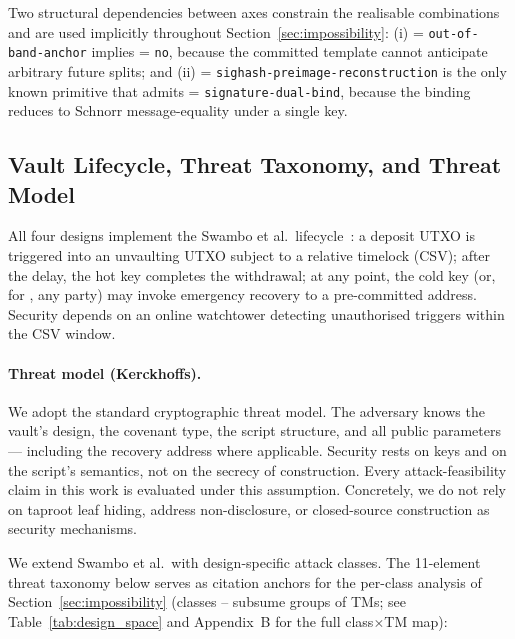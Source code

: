 Two structural dependencies between axes constrain the realisable
combinations and are used implicitly throughout
Section~\ref{sec:impossibility}: (i) \axfee{} =
\texttt{out-of-band-anchor} implies \axrevault{} = \texttt{no}, because
the committed template cannot anticipate arbitrary future splits; and
(ii) \axintro{} = \texttt{sighash-preimage-reconstruction} is the only
known primitive that admits \axwdbind{} =
\texttt{signature-dual-bind}, because the binding reduces to Schnorr
message-equality under a single key.

\subsection{Vault Lifecycle, Threat Taxonomy, and Threat Model}
\label{sec:bg:lifecycle}

All four designs implement the Swambo et al.\ lifecycle~\cite{SHMB20}:
a deposit UTXO is triggered into an unvaulting UTXO subject to a
relative timelock (CSV); after the delay, the hot key completes the
withdrawal; at any point, the cold key (or, for \opccv{}, any party)
may invoke emergency recovery to a pre-committed address. Security
depends on an online watchtower detecting unauthorised triggers within
the CSV window.

\paragraph{Threat model (Kerckhoffs).} We adopt the standard
cryptographic threat model. The adversary knows the vault's design,
the covenant type, the script structure, and all public parameters
--- including the recovery address where applicable. Security rests on
keys and on the script's semantics, not on the secrecy of
construction. Every attack-feasibility claim in this work is evaluated
under this assumption. Concretely, we do not rely on taproot leaf
hiding, address non-disclosure, or closed-source construction as
security mechanisms.

\medskip We extend Swambo et al.\ with design-specific attack classes.
The 11-element threat taxonomy below serves as citation anchors for
the per-class analysis of Section~\ref{sec:impossibility} (classes
\classfee{}--\classmode{} subsume groups of TMs; see
Table~\ref{tab:design_space} and Appendix~B for the full class$\times$TM
map):

